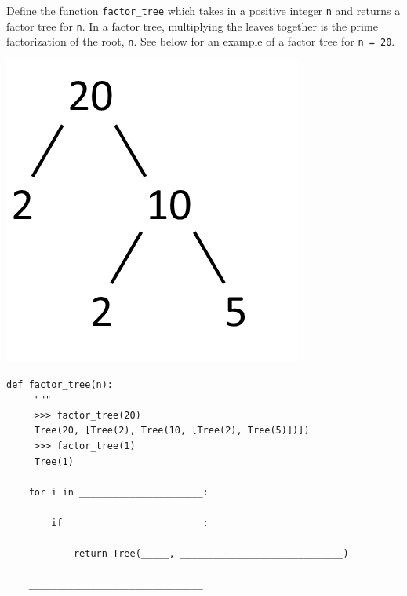 \begin{blocksection}
\question Define the function \texttt{factor\_tree} which takes in a positive integer \texttt{n} and returns a factor tree for \texttt{n}. In a factor tree, multiplying the leaves together is the prime factorization of the root, \texttt{n}. See below for an example of a factor tree for \texttt{n = 20}.
\begin{center}
\includegraphics[scale=0.3]{factor_tree_20.png}
\end{center}

\vspace{2\baselineskip}
\begin{lstlisting}
def factor_tree(n):
     """
     >>> factor_tree(20)
     Tree(20, [Tree(2), Tree(10, [Tree(2), Tree(5)])])
     >>> factor_tree(1)
     Tree(1)

    for i in ______________________:

        if ________________________:

            return Tree(_____, _____________________________)

    _______________________________
\end{lstlisting}


\end{blocksection}
